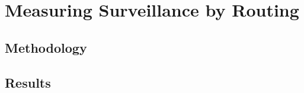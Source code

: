 \section{Measuring Surveillance by Routing}
\label{measure}

\subsection{Methodology}

\subsection{Results}
